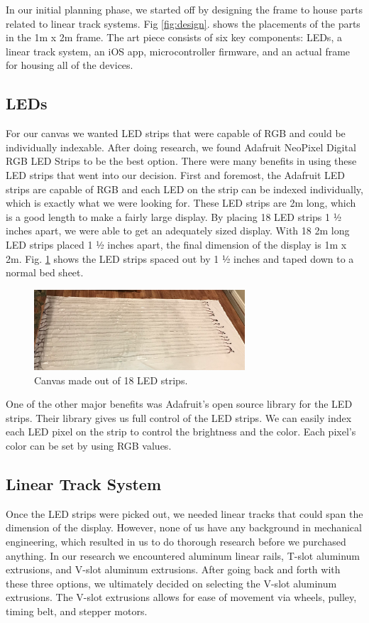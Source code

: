 \documentclass[12pt]{article}
\begin{document}
In our initial planning phase, we started off by designing the frame to house parts related to linear track systems. Fig \ref{fig:design}. shows the placements of the parts in the 1m x 2m frame. The art piece consists of six key components: LEDs, a linear track system, an iOS app, microcontroller firmware, and an actual frame for housing all of the devices.

\subsection{LEDs}
For our canvas we wanted LED strips that were capable of RGB and could be individually indexable. After doing research, we found Adafruit NeoPixel Digital RGB LED Strips to be the best option. There were many benefits in using these LED strips that went into our decision. First and foremost, the Adafruit LED strips are capable of RGB and each LED on the strip can be indexed individually, which is exactly what we were looking for. These LED strips are 2m long, which is a good length to make a fairly large display. By placing 18 LED strips 1 ½ inches apart, we were able to get an adequately sized display. With 18 2m long LED strips placed 1 ½ inches apart, the final dimension of the display is 1m x 2m. Fig. \ref{fig:ledstripsonsheet} shows the LED strips spaced out by 1 ½ inches and taped down to a normal bed sheet.

\begin{figure}[H]
  \centering
  \includegraphics[width=0.7\textwidth]{image6.png}
  \caption{Canvas made out of 18 LED strips.}
  \label{fig:ledstripsonsheet}
\end{figure}

One of the other major benefits was Adafruit’s open source library for the LED strips. Their library gives us full control of the LED strips. We can easily index each LED pixel on the strip to control the brightness and the color. Each pixel’s color can be set by using RGB values.

\subsection{Linear Track System}
Once the LED strips were picked out, we needed linear tracks that could span the dimension of the display. However, none of us have any background in mechanical engineering, which resulted in us to do thorough research before we purchased anything. In our research we encountered aluminum linear rails, T-slot aluminum extrusions, and V-slot aluminum extrusions. After going back and forth with these three options, we ultimately decided on selecting the V-slot aluminum extrusions. The V-slot extrusions allows for ease of movement via wheels, pulley, timing belt, and stepper motors. 
\end{document}

